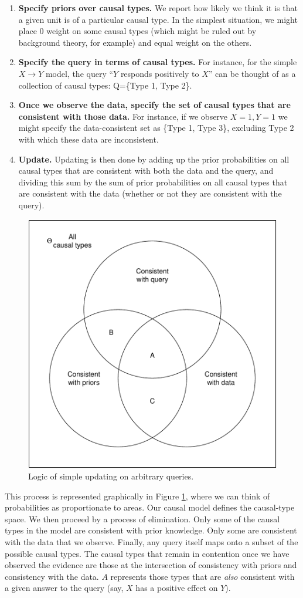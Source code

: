 \documentclass[
  12pt,
]{book}
\begin{document}
\begin{enumerate}
\def\labelenumi{\arabic{enumi}.}
\setcounter{enumi}{1}
\item
  \textbf{Specify priors over causal types.} We report how likely we think it is that a given unit is of a particular causal type. In the simplest situation, we might place 0 weight on some causal types (which might be ruled out by background theory, for example) and equal weight on the others.
\item
  \textbf{Specify the query in terms of causal types.} For instance, for the simple \(X \rightarrow Y\) model, the query ``\(Y\) responds positively to \(X\)'' can be thought of as a collection of causal types: Q=\{Type 1, Type 2\}.
\item
  \textbf{Once we observe the data, specify the set of causal types that are consistent with those data.} For instance, if we observe \(X=1, Y=1\) we might specify the data-consistent set as \{Type 1, Type 3\}, excluding Type 2 with which these data are inconsistent.
\item
  \textbf{Update.} Updating is then done by adding up the prior probabilities on all causal types that are consistent with both the data and the query, and dividing this sum by the sum of prior probabilities on all causal types that are consistent with the data (whether or not they are consistent with the query).
\end{enumerate}

\begin{figure}

{\centering \includegraphics[width=0.5\linewidth]{ii_files/figure-latex/ptvenn-1} 

}

\caption{Logic of simple updating on arbitrary queries.}\label{fig:ptvenn}
\end{figure}

This process is represented graphically in Figure \ref{fig:ptvenn}, where we can think of probabilities as proportionate to areas. Our causal model defines the causal-type space. We then proceed by a process of elimination. Only some of the causal types in the model are consistent with prior knowledge. Only some are consistent with the data that we observe. Finally, any query itself maps onto a subset of the possible causal types. The causal types that remain in contention once we have observed the evidence are those at the intersection of consistency with priors and consistency with the data. \(A\) represents those types that are \emph{also} consistent with a given answer to the query (say, \(X\) has a positive effect on \(Y\)).
\end{document}
